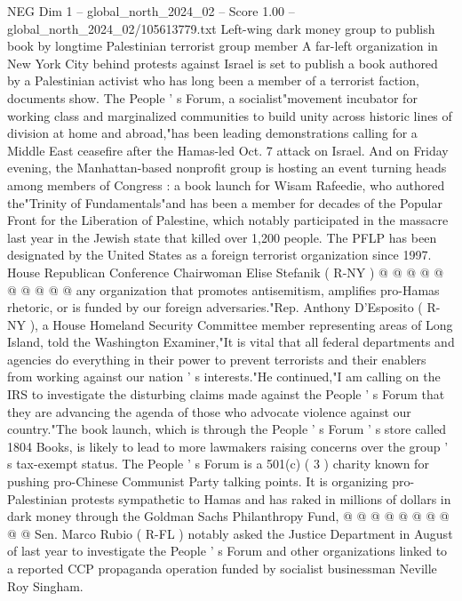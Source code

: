 \begin{textsample}{NEG Dim 1 – global\_north\_2024\_02 – Score 1.00 – global\_north\_2024\_02/105613779.txt}  \label{ex:f1_neg_185}
Left-wing dark money group to publish book by longtime Palestinian terrorist group member A far-left organization in New York City behind protests against Israel is set to publish a book authored by a Palestinian activist who has long been a member of a terrorist faction, documents show.
The People ' s Forum, a socialist"movement incubator for working class and marginalized communities to build unity across historic lines of division at home and abroad,"has been leading demonstrations calling for a Middle East ceasefire after the Hamas-led Oct. 7 attack on Israel.
And on Friday evening, the Manhattan-based nonprofit group is hosting an event turning heads among members of Congress : a book launch for Wisam Rafeedie, who authored the"Trinity of Fundamentals"and has been a member for decades of the Popular Front for the Liberation of Palestine, which notably participated in the massacre last year in the Jewish state that killed over 1,200 people.
The PFLP has been designated by the United States as a foreign terrorist organization since 1997.
House Republican Conference Chairwoman Elise Stefanik ( R-NY ) @ @ @ @ @ @ @ @ @ @ any organization that promotes antisemitism, amplifies pro-Hamas rhetoric, or is funded by our foreign adversaries."Rep.
Anthony D'Esposito ( R-NY ), a House Homeland Security Committee member representing areas of Long Island, told the Washington Examiner,"It is vital that all federal departments and agencies do everything in their power to prevent terrorists and their enablers from working against our nation ' s interests."He continued,"I am calling on the IRS to investigate the disturbing claims made against the People ' s Forum that they are advancing the agenda of those who advocate violence against our country."The book launch, which is through the People ' s Forum ' s store called 1804 Books, is likely to lead to more lawmakers raising concerns over the group ' s tax-exempt status.
The People ' s Forum is a 501(c) ( 3 ) charity known for pushing pro-Chinese Communist Party talking points.
It is organizing pro-Palestinian protests sympathetic to Hamas and has raked in millions of dollars in dark money through the Goldman Sachs Philanthropy Fund, @ @ @ @ @ @ @ @ @ @ Sen.
Marco Rubio ( R-FL ) notably asked the Justice Department in August of last year to investigate the People ' s Forum and other organizations linked to a reported CCP propaganda operation funded by socialist businessman Neville Roy Singham.

\end{textsample}
